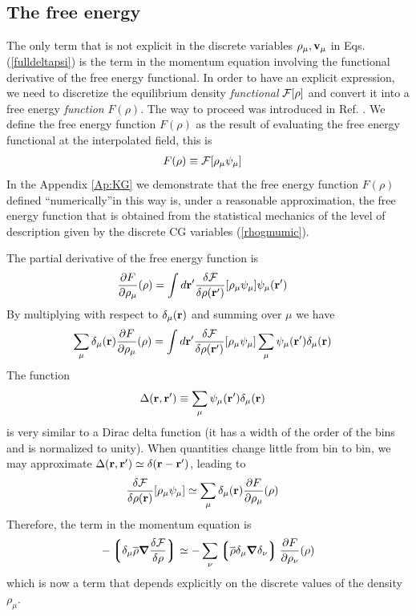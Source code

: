 \documentclass[b5paper,openright,11pt]{book}
\newcommand{\llg}{\left\lgroup}
\newcommand{\rlg}{\right\rgroup}
\begin{document}
\subsection{The free energy}
The  only  term  that  is  not  explicit  in  the  discrete  variables
$\rho_\mu,{\bf v}_\mu$ in Eqs. (\ref{fulldeltapsi}) is the term
in the  momentum equation involving  the functional derivative  of the
free energy  functional. In order  to have an explicit  expression, we
need to discretize the  equilibrium density \textit{functional} ${\cal
  F}[\rho]$ and convert it into a  free energy  \textit{function}
$F(\rho)$.    The    way    to   proceed    was    introduced    in
Ref. \cite{DelaTorre2015}.   We define  the free energy function $F(\rho)$
 as  the result of  evaluating the free energy  functional at
the interpolated field, this is
\begin{align}
  F(\rho)&\equiv{\cal F}[\rho_\mu\psi_\mu]
\label{DefF}
\end{align}
In the  Appendix \ref{Ap:KG} we  demonstrate that the free  energy function
$F(\rho)$ defined  ``numerically''in this  way is, under  a reasonable
approximation,  the free  energy function  that is  obtained from  the
statistical  mechanics  of  the  level of  description  given  by  the
discrete CG variables (\ref{rhogmumic}).

The partial derivative of the free energy function is
\begin{align}
\frac{\partial  F}{\partial \rho_\mu}(\rho)&=\int d{\bf r}'\frac{\delta {\cal F}}{\delta \rho({\bf r}')}[\rho_\mu\psi_\mu]\psi_\mu({\bf r}')
\end{align}
By multiplying with respect to $\delta_\mu({\bf r})$ and summing over $\mu$ we have
\begin{align}
\sum_\mu\delta_\mu({\bf r})\frac{\partial  F}{\partial \rho_\mu}(\rho)
&=\int d{\bf r}'\frac{\delta {\cal F}}{\delta \rho({\bf r}')}[\rho_\mu\psi_\mu]
\sum_\mu\psi_\mu({\bf r}')\delta_\mu({\bf r})
\end{align}
The  function
\begin{align}
\Delta({\bf  r},{\bf  r}')&\equiv\sum_\mu\psi_\mu({\bf  r}')\delta_\mu({\bf r})  
\label{Delta}
\end{align}
 is  very similar to a  Dirac delta function
(it  has a  width  of the  order  of  the bins  and  is normalized  to
unity).  When  quantities  change  little  from bin  to  bin,  we  may
approximate $\Delta({\bf r},{\bf r}')\simeq \delta({\bf r}-{\bf r}')$,
leading to
\begin{align}
\frac{\delta {\cal F}}{\delta \rho({\bf r})}[\rho_\mu\psi_\mu]
&\simeq\sum_\mu\delta_\mu({\bf r})\frac{\partial  F}{\partial \rho_\mu}(\rho)
\label{gradF}
\end{align}
Therefore, the term in the momentum equation is
\begin{align}
-\llg
\delta_{\mu}\overline{\rho}\boldsymbol{\nabla}\frac{\delta{\cal F}}{\delta\rho}\rlg
\simeq  -\sum_\nu\llg\overline{\rho}\delta_{\mu}\boldsymbol{\nabla}\delta_{\nu}\rlg
\frac{\partial  F}{\partial \rho_{\nu}}(\rho)
\end{align}
which is now a term that depends explicitly on the discrete values of the density $\rho_\mu$.
\end{document}
